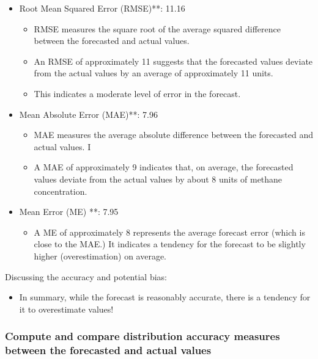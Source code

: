 \documentclass[
]{article}
\providecommand{\tightlist}{%
  \setlength{\itemsep}{0pt}\setlength{\parskip}{0pt}}
\begin{document}
\begin{itemize}
\item
  Root Mean Squared Error (RMSE)**: 11.16

  \begin{itemize}
  \item
    RMSE measures the square root of the average squared difference
    between the forecasted and actual values.
  \item
    An RMSE of approximately 11 suggests that the forecasted values
    deviate from the actual values by an average of approximately 11
    units.
  \item
    This indicates a moderate level of error in the forecast.
  \end{itemize}
\item
  Mean Absolute Error (MAE)**: 7.96

  \begin{itemize}
  \item
    MAE measures the average absolute difference between the forecasted
    and actual values. I
  \item
    A MAE of approximately 9 indicates that, on average, the forecasted
    values deviate from the actual values by about 8 units of methane
    concentration.
  \end{itemize}
\item
  Mean Error (ME) **: 7.95

  \begin{itemize}
  \tightlist
  \item
    A ME of approximately 8 represents the average forecast error (which
    is close to the MAE.) It indicates a tendency for the forecast to be
    slightly higher (overestimation) on average.
  \end{itemize}
\end{itemize}

Discussing the accuracy and potential bias:

\begin{itemize}
\tightlist
\item
  In summary, while the forecast is reasonably accurate, there is a
  tendency for it to overestimate values!
\end{itemize}

\hypertarget{compute-and-compare-distribution-accuracy-measures-between-the-forecasted-and-actual-values}{%
\subsubsection{Compute and compare distribution accuracy measures
between the forecasted and actual
values}\label{compute-and-compare-distribution-accuracy-measures-between-the-forecasted-and-actual-values}}
\end{document}
